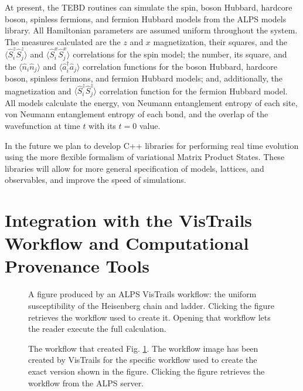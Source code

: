 \documentclass[12pt]{iopart}
\begin{document}
At present, the TEBD routines can simulate the spin, boson Hubbard, hardcore boson, spinless fermions, and fermion Hubbard models from the ALPS models library.  All Hamiltonian parameters are assumed uniform throughout the system.  The measures calculated are the $z$ and $x$ magnetization, their squares, and the $\langle \hat{S}^z_i \hat{S}^z_j\rangle$ and $\langle \hat{S}^x_i \hat{S}^x_j\rangle$ correlations for the spin model; the number, its square, and the $\langle \hat{n}_i \hat{n}_j\rangle$ and $\langle \hat{a}_i^{\dagger} \hat{a}_j\rangle$ correlation functions for the boson Hubbard, hardcore boson, spinless ferimons, and fermion Hubbard models; and, additionally, the magnetization and $\langle \hat{S}^z_i \hat{S}^z_j\rangle$ correlation function for the fermion Hubbard model.  All models calculate the energy, von Neumann entanglement entropy of each site, von Neumann entanglement entropy of each bond, and the overlap of the wavefunction at time $t$ with its $t=0$ value.

In the future we plan to develop C++ libraries for performing real time evolution using the more flexible formalism of variational Matrix Product States.  These libraries will allow for more general specification of models, lattices, and observables, and improve the speed of simulations. 


\section{Integration with the VisTrails Workflow and Computational Provenance Tools}
\begin{figure}
\begin{center}

\caption{A figure produced by an ALPS VisTrails workflow: the uniform susceptibility of the Heisenberg chain and ladder. Clicking the figure retrieves the workflow used to create it. Opening that workflow lets the reader execute the full calculation.}
\label{fig:figure}
\end{center}
\end{figure}


\begin{figure}
\begin{center}
\caption{The workflow that created Fig. \ref{fig:figure}. The workflow image has been created by VisTrails for the specific workflow used to create the exact version shown in the figure. Clicking the figure retrieves the workflow from the ALPS server.}
\label{fig:workflow}
\end{center}
\end{figure}
\end{document}

